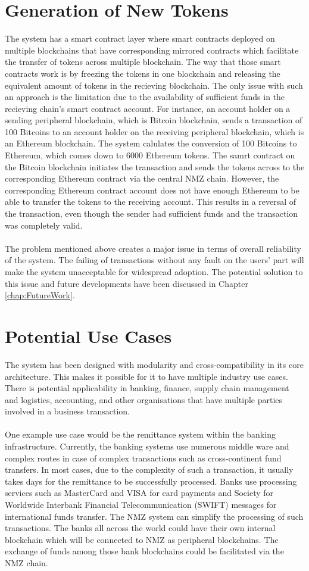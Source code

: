 \documentclass[a4paper,twoside,phd]{BYUPhys}
\begin{document}
\section{Generation of New Tokens}
The system has a smart contract layer where smart contracts deployed on multiple blockchains that have corresponding mirrored contracts which facilitate the transfer of tokens across multiple blockchain. The way that those smart contracts work is by freezing the tokens in one blockchain and releasing the equivalent amount of tokens in the recieving blockchain. The only issue with such an approach is the limitation due to the availability of sufficient funds in the recieving chain's smart contract account. For instance, an account holder on a sending peripheral blockchain, which is Bitcoin blockchain, sends a transaction of 100 Bitcoins to an account holder on the receiving peripheral blockchain, which is an Ethereum blockchain. The system calulates the conversion of 100 Bitcoins to Ethereum, which comes down to 6000 Ethereum tokens. The samrt contract on the Bitcoin blockchain initiates the transaction and sends the tokens across to the corresponding Ethereum contract via the central NMZ chain. However, the corresponding Ethereum contract account does not have enough Ethereum to be able to transfer the tokens to the receiving account. This results in a reversal of the transaction, even though the sender had sufficient funds and the transaction was completely valid. 
\\
\\
The problem mentioned above creates a major issue in terms of overall reliability of the system. The failing of transactions without any fault on the users' part will make the system unacceptable for widespread adoption. The potential solution to this issue and future developments have been discussed in Chapter \ref{chap:FutureWork}.
\section{Potential Use Cases}
The system has been designed with modularity and cross-compatibility in its core architecture. This makes it possible for it to have multiple industry use cases. There is potential applicability in banking, finance, supply chain management and logistics, accounting, and other organisations that have multiple parties involved in a business transaction. 
\\
\\
One example use case would be the remittance system within the banking infrastructure. Currently, the banking systems use numerous middle ware and complex routes in case of complex transactions such as cross-continent fund transfers. In most cases, due to the complexity of such a transaction, it usually takes days for the remittance to be successfully processed. Banks use processing services such as MasterCard and VISA for card payments and Society for Worldwide Interbank Financial Telecommunication (SWIFT) messages for international funds transfer. The NMZ system can simplify the processing of such transactions. The banks all across the world could have their own internal blockchain  which will be connected to NMZ as peripheral blockchains. The exchange of funds among those bank blockchains could be facilitated via the NMZ chain. 
\end{document}
